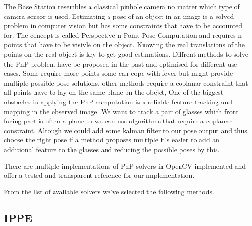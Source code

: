 The Base Station resembles a classical pinhole camera no matter which type of camera sensor is used.
Estimating a pose of an object in an image is a solved problem in computer vision but has some constraints that have to be accounted for.
The concept is called Perspective-n-Point Pose Computation and requires n points that have to be visivle on the object.
Knowing the real translations of the points on the real object is key to get good estimations.
Diffrent methods to solve the PnP problem have be proposed in the past and optimised for different use cases.
Some require more points some can cope with fever but might provide multiple possible pose solutions, other methods require a coplanar constraint that all points have to lay on the same plane on the obejct,
One of the biggest obstacles in applying the PnP computation is a reliable feature tracking and mapping in the observed image.
We want to track a pair of glasses which front facing part is often a plane so we can use algorithms that require a coplanar constraint.
Altough we could add some kalman filter to our pose output and thus choose the right pose if a method proposes multiple it's easier to add an additional feature to the glasses and reducing the possible poses by this.

There are multiple implementations of PnP solvers in OpenCV implemented and offer a tested and transparent reference for our implementation.

From the list of available solvers we've selected the following methods.


\subsection{IPPE}
\subsection{}


